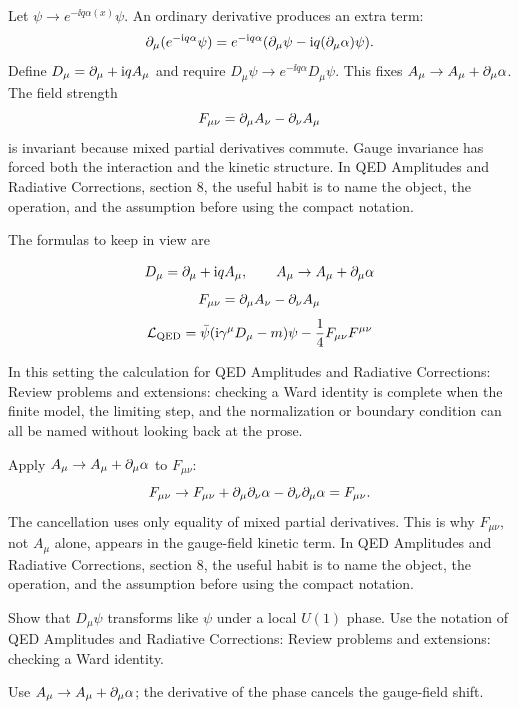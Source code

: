 Let \(\psi\to e^{-\ii q\alpha(x)}\psi\).  An ordinary derivative produces an extra term:
\[
  \partial_\mu(e^{-\mathrm i q\alpha}\psi)
  =
  e^{-\mathrm i q\alpha}(\partial_\mu\psi-\mathrm i q(\partial_\mu\alpha)\psi).
\]
Define \(D_\mu=\partial_\mu+\mathrm i qA_\mu\) and require \(D_\mu\psi\to e^{-\ii q\alpha}D_\mu\psi\).  This fixes \(A_\mu\to A_\mu+\partial_\mu\alpha\).  The field strength
\[
  F_{\mu\nu}=\partial_\mu A_\nu-\partial_\nu A_\mu
\]
is invariant because mixed partial derivatives commute.  Gauge invariance has forced both the interaction and the kinetic structure.  In QED Amplitudes and Radiative Corrections, section 8, the useful habit is to name the object, the operation, and the assumption before using the compact notation.

The formulas to keep in view are

\[
  D_\mu=\partial_\mu+\mathrm i qA_\mu,\qquad A_\mu\to A_\mu+\partial_\mu\alpha
\]
\[
  F_{\mu\nu}=\partial_\mu A_\nu-\partial_\nu A_\mu
\]
\[
  \mathcal L_{\mathrm{QED}}=\bar\psi(\mathrm i\gamma^\mu D_\mu-m)\psi-\frac14F_{\mu\nu}F^{\mu\nu}
\]

In this setting the calculation for QED Amplitudes and Radiative Corrections: Review problems and extensions: checking a Ward identity is complete when the finite model, the limiting step, and the normalization or boundary condition can all be named without looking back at the prose.




\begin{example}
Apply \(A_\mu\to A_\mu+\partial_\mu\alpha\) to \(F_{\mu\nu}\):
\[
  F_{\mu\nu}\to F_{\mu\nu}+\partial_\mu\partial_\nu\alpha-\partial_\nu\partial_\mu\alpha=F_{\mu\nu}.
\]
The cancellation uses only equality of mixed partial derivatives.  This is why \(F_{\mu\nu}\), not \(A_\mu\) alone, appears in the gauge-field kinetic term.  In QED Amplitudes and Radiative Corrections, section 8, the useful habit is to name the object, the operation, and the assumption before using the compact notation.
\end{example}



\begin{exercise}
Show that \(D_\mu\psi\) transforms like \(\psi\) under a local \(U(1)\) phase.  Use the notation of QED Amplitudes and Radiative Corrections: Review problems and extensions: checking a Ward identity.
\begin{answer}
Use \(A_\mu\to A_\mu+\partial_\mu\alpha\); the derivative of the phase cancels the gauge-field shift.
\end{answer}
\end{exercise}


